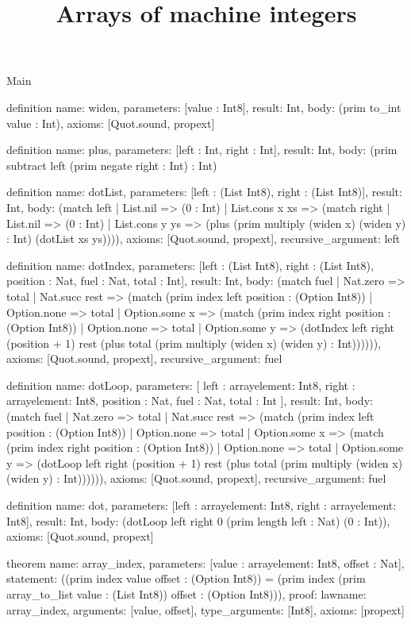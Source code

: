 \begin{lexlean}{Main}
\title{Arrays of machine integers}
\begin{semanticmodule}
definition{
  name: widen,
  parameters: [value : Int8],
  result: Int,
  body: (prim to_int value : Int),
  axioms: [Quot.sound, propext]
}

definition{
  name: plus,
  parameters: [left : Int, right : Int],
  result: Int,
  body: (prim subtract left (prim negate right : Int) : Int)
}

definition{
  name: dotList,
  parameters: [left : (List Int8), right : (List Int8)],
  result: Int,
  body: (match left
    | List.nil => (0 : Int)
    | List.cons x xs => (match right
      | List.nil => (0 : Int)
      | List.cons y ys => (plus (prim multiply (widen x) (widen y) : Int) (dotList xs ys)))),
  axioms: [Quot.sound, propext],
  recursive_argument: left
}

definition{
  name: dotIndex,
  parameters: [left : (List Int8), right : (List Int8), position : Nat, fuel : Nat, total : Int],
  result: Int,
  body: (match fuel
    | Nat.zero => total
    | Nat.succ rest => (match (prim index left position : (Option Int8))
      | Option.none => total
      | Option.some x => (match (prim index right position : (Option Int8))
        | Option.none => total
        | Option.some y => (dotIndex left right (position + 1) rest (plus total (prim multiply (widen x) (widen y) : Int)))))),
  axioms: [Quot.sound, propext],
  recursive_argument: fuel
}

definition{
  name: dotLoop,
  parameters: [
    left : array{element: Int8},
    right : array{element: Int8},
    position : Nat,
    fuel : Nat,
    total : Int
  ],
  result: Int,
  body: (match fuel
    | Nat.zero => total
    | Nat.succ rest => (match (prim index left position : (Option Int8))
      | Option.none => total
      | Option.some x => (match (prim index right position : (Option Int8))
        | Option.none => total
        | Option.some y => (dotLoop left right (position + 1) rest (plus total (prim multiply (widen x) (widen y) : Int)))))),
  axioms: [Quot.sound, propext],
  recursive_argument: fuel
}

definition{
  name: dot,
  parameters: [left : array{element: Int8}, right : array{element: Int8}],
  result: Int,
  body: (dotLoop left right 0 (prim length left : Nat) (0 : Int)),
  axioms: [Quot.sound, propext]
}

theorem{
  name: array_index,
  parameters: [value : array{element: Int8}, offset : Nat],
  statement: ((prim index value offset : (Option Int8)) = (prim index (prim array_to_list value : (List Int8)) offset : (Option Int8))),
  proof: law{name: array_index, arguments: [value, offset], type_arguments: [Int8]},
  axioms: [propext]
}


\end{semanticmodule}
\end{lexlean}
